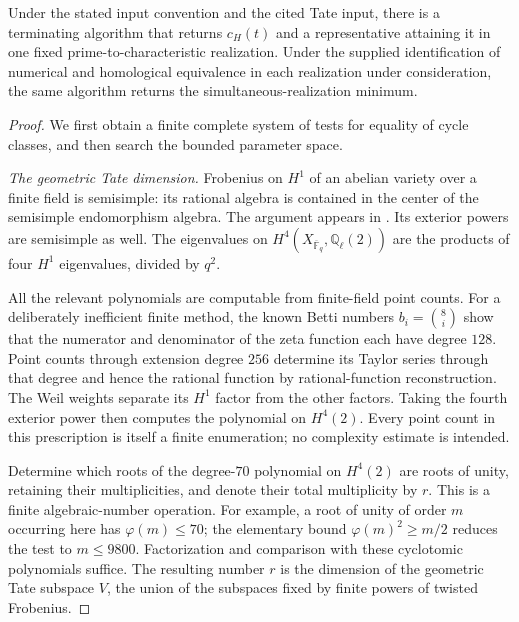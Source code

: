 \begin{theorem}
\label{thm:R40}
Under the stated input convention and the cited Tate input, there is a
terminating algorithm that returns $c_H(t)$ and a representative
attaining it in one fixed prime-to-characteristic realization. Under
the supplied identification of numerical and homological equivalence
in each realization under consideration, the same algorithm returns
the simultaneous-realization minimum.
\end{theorem}
\begin{proof}
We first obtain a finite complete system of tests for equality of cycle
classes, and then search the bounded parameter space.

\emph{The geometric Tate dimension.}
Frobenius on $H^1$ of an abelian variety over a finite field is
semisimple: its rational algebra is contained in the center of the
semisimple endomorphism algebra. The argument appears in
\cite[\S2, pp.~138--139; Theorem 2(a), p.~140]{Tate1966}.
Its exterior powers are semisimple as well. The eigenvalues on
$H^4(X_{\overline{\mathbb F}_q},\mathbb Q_\ell(2))$ are the products
of four $H^1$ eigenvalues, divided by $q^2$.

All the relevant polynomials are computable from finite-field point
counts. For a deliberately inefficient finite method, the known Betti
numbers $b_i=\binom8i$ show that the numerator and denominator of the
zeta function each have degree $128$. Point counts through extension
degree $256$ determine its Taylor series through that degree and hence
the rational function by rational-function reconstruction. The Weil
weights separate its $H^1$ factor from the other factors. Taking the
fourth exterior power then computes the polynomial on $H^4(2)$.
Every point count in this prescription is itself a finite enumeration;
no complexity estimate is intended.

Determine which roots of the degree-$70$ polynomial on $H^4(2)$ are
roots of unity, retaining their multiplicities, and denote their total
multiplicity by $r$. This is a finite algebraic-number operation. For
example, a root of unity of order $m$ occurring here has
$\varphi(m)\leq70$; the elementary bound
$\varphi(m)^2\geq m/2$ reduces the test to $m\leq9800$.
Factorization and comparison with these cyclotomic polynomials suffice.
The resulting number $r$ is the dimension of the geometric Tate
subspace $V$, the union of the subspaces fixed by finite powers of
twisted Frobenius.


\end{proof}
